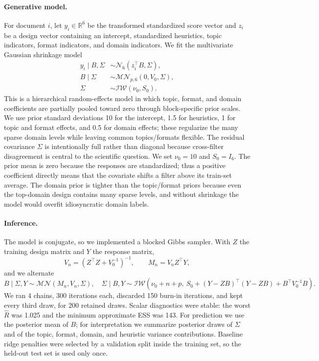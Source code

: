 \documentclass{article}
\newcommand{\R}{\mathbb{R}}
\newcommand{\N}{\mathcal{N}}
\newcommand{\IW}{\mathcal{IW}}
\newcommand{\MN}{\mathcal{MN}}
\begin{document}
\paragraph{Generative model.}
For document $i$, let $y_i\in\R^6$ be the transformed standardized score vector
and $z_i$ be a design vector containing an intercept, standardized heuristics,
topic indicators, format indicators, and domain indicators. We fit the
multivariate Gaussian shrinkage model
\begin{align}
  y_i \mid B,\Sigma &\sim \N_6(z_i^\top B,\Sigma),\\
  B\mid\Sigma &\sim \MN_{p,6}(0,V_0,\Sigma),\\
  \Sigma &\sim \IW(\nu_0,S_0).
\end{align}
This is a hierarchical random-effects model in which topic, format, and domain
coefficients are partially pooled toward zero through block-specific prior
scales. We use prior standard deviations 10 for the intercept, 1.5 for
heuristics, 1 for topic and format effects, and 0.5 for domain effects; these
regularize the many sparse domain levels while leaving common topics/formats
flexible. The residual covariance $\Sigma$ is intentionally full rather than
diagonal because cross-filter disagreement is central to the scientific
question. We set $\nu_0=10$ and $S_0=I_6$. The prior mean is zero because the
responses are standardized; thus a positive coefficient directly means that the
covariate shifts a filter above its train-set average. The domain prior is
tighter than the topic/format priors because even the top-domain design contains
many sparse levels, and without shrinkage the model would overfit idiosyncratic
domain labels.

\paragraph{Inference.}
The model is conjugate, so we implemented a blocked Gibbs sampler. With
$Z$ the training design matrix and $Y$ the response matrix,
\[
  V_n=(Z^\top Z+V_0^{-1})^{-1},\qquad
  M_n=V_n Z^\top Y,
\]
and we alternate
\[
  B\mid\Sigma,Y \sim \MN(M_n,V_n,\Sigma),\quad
  \Sigma\mid B,Y \sim \IW(\nu_0+n+p,\ S_0+(Y-ZB)^\top(Y-ZB)+B^\top V_0^{-1}B).
\]
We ran 4 chains, 300 iterations each, discarded 150 burn-in iterations, and
kept every third draw, for 200 retained draws. Scalar diagnostics were stable:
the worst $\widehat R$ was 1.025 and the minimum approximate ESS was 143. For
prediction we use the posterior mean of $B$; for interpretation we summarize
posterior draws of $\Sigma$ and of the topic, format, domain, and heuristic
variance contributions. Baseline ridge penalties were selected by a validation
split inside the training set, so the held-out test set is used only once.
\end{document}
